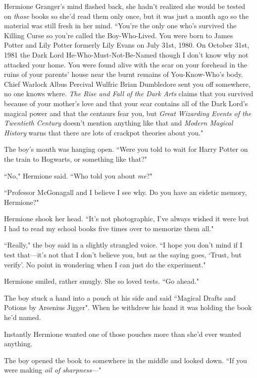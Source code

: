 Hermione Granger's mind flashed back, she hadn't realized she would be tested on \emph{those} books so she'd read them only once, but it was just a month ago so the material was still fresh in her mind. ``You're the only one who's survived the Killing Curse so you're called the Boy-Who-Lived. You were born to James Potter and Lily Potter formerly Lily Evans on July 31st, 1980. On October 31st, 1981 the Dark Lord He-Who-Must-Not-Be-Named though I don't know why not attacked your home. You were found alive with the scar on your forehead in the ruins of your parents' house near the burnt remains of You-Know-Who's body. Chief Warlock Albus Percival Wulfric Brian Dumbledore sent you off somewhere, no one knows where. \emph{The Rise and Fall of the Dark Arts} claims that you survived because of your mother's love and that your scar contains all of the Dark Lord's magical power and that the centaurs fear you, but \emph{Great Wizarding Events of the Twentieth Century} doesn't mention anything like that and \emph{Modern Magical History} warns that there are lots of crackpot theories about you."

The boy's mouth was hanging open. ``Were you told to wait for Harry Potter on the train to Hogwarts, or something like that?"

``No," Hermione said. ``Who told you about \emph{me}?"

``Professor McGonagall and I believe I see why. Do you have an eidetic memory, Hermione?"

Hermione shook her head. ``It's not photographic, I've always wished it were but I had to read my school books five times over to memorize them all."

``Really," the boy said in a slightly strangled voice. ``I hope you don't mind if I test that---it's not that I don't believe you, but as the saying goes, `Trust, but verify'. No point in wondering when I can just do the experiment."

Hermione smiled, rather smugly. She so loved tests. ``Go ahead."

The boy stuck a hand into a pouch at his side and said ``Magical Drafts and Potions by Arsenius Jigger". When he withdrew his hand it was holding the book he'd named.

Instantly Hermione wanted one of those pouches more than she'd ever wanted anything.

The boy opened the book to somewhere in the middle and looked down. ``If you were making \emph{oil of sharpness}---"

